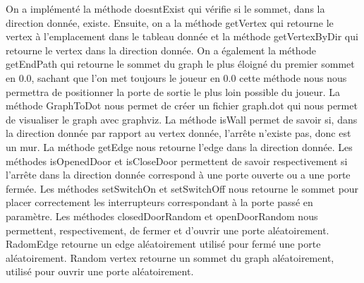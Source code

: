 \documentclass [10pt, a4paper]{article}
\begin{document}
On a implémenté la méthode doesntExist qui vérifie si le sommet, dans la direction donnée, existe. Ensuite, on a la méthode getVertex qui retourne le vertex à l'emplacement dans le tableau donnée et la méthode getVertexByDir qui retourne le vertex dans la direction donnée. On a également la méthode getEndPath qui retourne le sommet du graph le plus éloigné du premier sommet en 0.0, sachant que l'on met toujours le joueur en 0.0 cette méthode nous nous permettra de positionner la porte de sortie le plus loin possible du joueur. La méthode GraphToDot nous permet de créer un fichier graph.dot qui nous permet de visualiser le graph avec graphviz. La méthode isWall permet de savoir si, dans la direction donnée par rapport au vertex donnée, l'arrête n'existe pas, donc est un mur. La méthode getEdge nous retourne l'edge dans la direction donnée. Les méthodes isOpenedDoor et isCloseDoor permettent de savoir respectivement si l'arrête dans la direction donnée correspond à une porte ouverte ou a une porte fermée. Les méthodes setSwitchOn et setSwitchOff nous retourne le sommet pour placer correctement les interrupteurs correspondant à la porte passé en paramètre.
Les méthodes closedDoorRandom et openDoorRandom nous permettent, respectivement, de fermer et d'ouvrir une porte aléatoirement. RadomEdge retourne un edge aléatoirement utilisé pour fermé une porte aléatoirement. Random vertex retourne un sommet du graph aléatoirement, utilisé pour ouvrir une porte aléatoirement.
\end{document}
